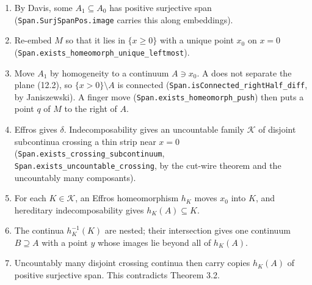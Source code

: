 \documentclass[11pt]{article}
\newcommand{\lean}[1]{\texttt{#1}}
\begin{document}
\begin{enumerate}
  \item[1.] By Davis, some $A_1 \subseteq A_0$ has positive surjective span (\lean{Span.\hspace{0pt}SurjSpanPos.\hspace{0pt}image} carries this along embeddings).
  \item[2.] Re-embed $M$ so that it lies in $\{x \geq 0\}$ with a unique point $x_0$ on $x = 0$ (\lean{Span.\hspace{0pt}exists\_\hspace{0pt}homeomorph\_\hspace{0pt}unique\_\hspace{0pt}leftmost}).
  \item[3.] Move $A_1$ by homogeneity to a continuum $A \ni x_0$. A does not separate the plane (12.2), so $\{x > 0\} \setminus A$ is connected (\lean{Span.\hspace{0pt}isConnected\_\hspace{0pt}rightHalf\_\hspace{0pt}diff}, by Janiszewski). A finger move (\lean{Span.\hspace{0pt}exists\_\hspace{0pt}homeomorph\_\hspace{0pt}push}) then puts a point $q$ of $M$ to the right of $A$.
  \item[4.] Effros gives $\delta$. Indecomposability gives an uncountable family $\mathcal{K}$ of disjoint subcontinua crossing a thin strip near $x = 0$ (\lean{Span.\hspace{0pt}exists\_\hspace{0pt}crossing\_\hspace{0pt}subcontinuum}, \lean{Span.\hspace{0pt}exists\_\hspace{0pt}uncountable\_\hspace{0pt}crossing}, by the cut-wire theorem and the uncountably many composants).
  \item[5.] For each $K \in \mathcal{K}$, an Effros homeomorphism $h_K$ moves $x_0$ into $K$, and hereditary indecomposability gives $h_K(A) \subseteq K$.
  \item[6.] The continua $h_K^{-1}(K)$ are nested; their intersection gives one continuum $B \supseteq A$ with a point $y$ whose images lie beyond all of $h_K(A)$.
  \item[7.] Uncountably many disjoint crossing continua then carry copies $h_K(A)$ of positive surjective span. This contradicts Theorem 3.2.
\end{enumerate}
\end{document}
